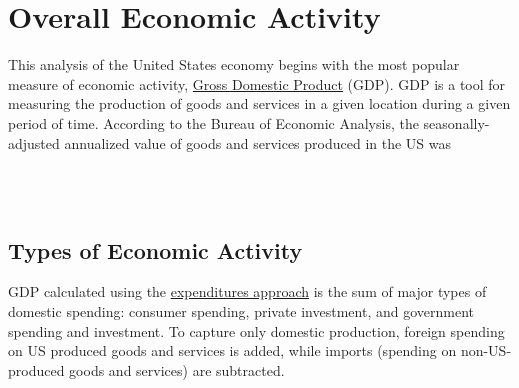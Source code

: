 \documentclass{report}
\begin{document}
\newpage

\section*{\color{darkgray} \LARGE Overall Economic Activity}
\label{sec:oea}
\begin{minipage}{0.61\textwidth}
\small This analysis of the United States economy begins with the most popular measure of economic activity, \href{https://www.bea.gov/data/gdp/gross-domestic-product}{Gross Domestic Product} (GDP). GDP is a tool for measuring the production of goods and services in a given location during a given period of time. According to the Bureau of Economic Analysis, the seasonally-adjusted annualized value of goods and services produced in the US was \\

\\
\end{minipage}\hfill
\begin{minipage}{0.34\textwidth}
\\
\end{minipage}

\begin{minipage}{0.76\textwidth}
\subsection*{\color{black!70}\seriffont Types of Economic Activity}

\small GDP calculated using the \href{https://www.bea.gov/help/glossary/expenditures-approach}{expenditures approach} is the sum of major types of domestic spending: consumer spending, private investment, and government spending and investment. To capture only domestic production, foreign spending on US produced goods and services is added, while imports (spending on non-US-produced goods and services) are subtracted.
\end{minipage}
\end{document}
